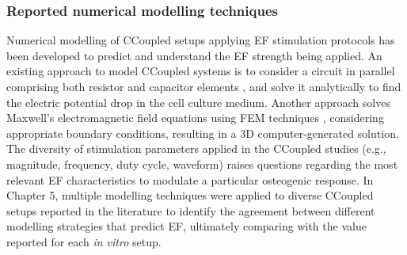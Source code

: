 \subsubsection{Reported numerical modelling techniques}
Numerical modelling of \ac{CCoupled} setups applying \ac{EF} stimulation protocols has been developed to predict and understand the \ac{EF} strength being applied. An existing approach to model \acs{CCoupled} systems is to consider a circuit in parallel comprising both resistor and capacitor elements \cite{Hartig2000-ny, Korenstein1984-qb}, and solve it analytically to find the electric potential drop in the cell culture medium. Another approach solves Maxwell’s electromagnetic field equations using \acs{FEM} techniques \cite{Brighton1992-gg, Armstrong1988-ob, Stephan2020-qh}, considering appropriate boundary conditions, resulting in a \ac{3D} computer-generated solution. The diversity of stimulation parameters applied in the \acs{CCoupled} studies (e.g., magnitude, frequency, duty cycle, waveform) raises questions regarding the most relevant \ac{EF} characteristics to modulate a particular osteogenic response. In Chapter 5, multiple modelling techniques were applied to diverse \ac{CCoupled} setups reported in the literature to identify the agreement between different modelling strategies that predict \ac{EF}, ultimately comparing with the value reported for each \textit{in vitro} setup.
  


